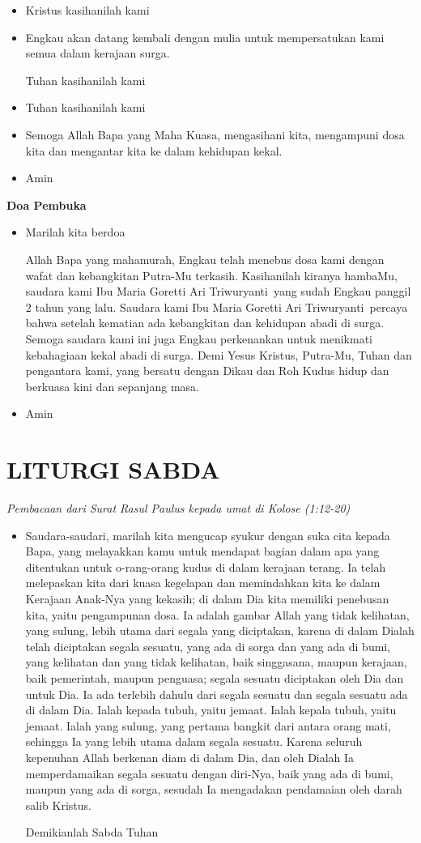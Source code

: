 \documentclass[a5paper,headsepline,titlepage,11pt,normalheadings,DIVcalc]{scrbook}
\makeatletter
\newcommand{\subjudul}[1]{%
  {\parindent \z@ 
    \interlinepenalty\@M \bfseries #1\par\nobreak \vskip 10\p@ }}
\newcommand{\keterangan}[1]{%
  {\parindent \z@  \slshape 
    \interlinepenalty\@M \textsl{#1}\par\nobreak  \vskip 5\p@}}
\newcommand{\BU}[1]{\begin{itemize} \item[U:] #1 \end{itemize}}
\newcommand{\BI}[1]{\begin{itemize} \item[I:] #1 \end{itemize}}
\newcommand{\namaalm}{Ibu Maria Goretti Ari Triwuryanti~}
\makeatother
\begin{document}
\BU{Kristus kasihanilah kami}

\BI{Engkau akan datang kembali dengan mulia untuk mempersatukan kami semua dalam kerajaan surga.

Tuhan kasihanilah kami}

\BU{Tuhan kasihanilah kami}

\BI{Semoga Allah Bapa yang Maha Kuasa, mengasihani kita, 
mengampuni dosa kita dan mengantar kita ke dalam 
kehidupan kekal.}

\BU{Amin}

 

\subjudul{Doa Pembuka}

\BI{Marilah kita berdoa 

Allah Bapa yang mahamurah, Engkau telah menebus dosa
kami dengan wafat dan kebangkitan Putra-Mu terkasih.
Kasihanilah kiranya hambaMu, saudara kami \namaalm yang sudah
Engkau panggil 2 tahun yang lalu. Saudara kami \namaalm percaya
bahwa setelah kematian ada kebangkitan dan kehidupan abadi
di surga. Semoga saudara kami ini juga Engkau perkenankan
untuk menikmati kebahagiaan kekal abadi di surga. Demi
Yesus Kristus, Putra-Mu, Tuhan dan pengantara kami, yang
bersatu dengan Dikau dan Roh Kudus hidup dan berkuasa kini
dan sepanjang masa.
}

\BU{Amin}

 

\section*{LITURGI SABDA} 

\keterangan{Pembacaan dari Surat Rasul Paulus kepada umat di Kolose
(1:12-20)}

\BU{Saudara-saudari, marilah kita mengucap syukur dengan suka cita kepada
Bapa, yang melayakkan kamu untuk mendapat bagian dalam
apa yang ditentukan untuk o-rang-orang kudus di dalam kerajaan
terang. Ia telah melepaskan kita dari kuasa kegelapan dan
memindahkan kita ke dalam Kerajaan Anak-Nya yang kekasih;
di dalam Dia kita memiliki penebusan kita, yaitu pengampunan
dosa. Ia adalah gambar Allah yang tidak kelihatan, yang
sulung, lebih utama dari segala yang diciptakan, karena di
dalam Dialah telah diciptakan segala sesuatu, yang ada di sorga
dan yang ada di bumi, yang kelihatan dan yang tidak kelihatan,
baik singgasana, maupun kerajaan, baik pemerintah, maupun
penguasa; segala sesuatu diciptakan oleh Dia dan untuk Dia. Ia
ada terlebih dahulu dari segala sesuatu dan segala sesuatu ada
di dalam Dia. Ialah kepada tubuh, yaitu jemaat. Ialah kepala
tubuh, yaitu jemaat. Ialah yang sulung, yang pertama bangkit
dari antara orang mati, sehingga Ia yang lebih utama dalam
segala sesuatu. Karena seluruh kepenuhan Allah berkenan diam
di dalam Dia, dan oleh Dialah Ia memperdamaikan segala
sesuatu dengan diri-Nya, baik yang ada di bumi, maupun yang
ada di sorga, sesudah Ia mengadakan pendamaian oleh darah
salib Kristus.

Demikianlah Sabda Tuhan}
\end{document}
